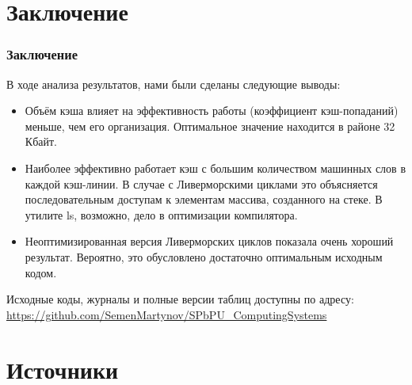 \documentclass{beamer}
\begin{document}
\section{Заключение}

\begin{frame}
\frametitle{Заключение}

В ходе анализа результатов, нами были сделаны следующие выводы:

\begin{itemize}
\item Объём кэша влияет на эффективность работы (коэффициент кэш-попаданий) меньше, чем его организация. Оптимальное значение находится в районе 32 Кбайт.
\item Наиболее эффективно работает кэш с большим количеством машинных слов в каждой кэш-линии. В случае с Ливерморскими циклами это объясняется последовательным доступам к элементам массива, созданного на стеке. В утилите ls, возможно, дело в оптимизации компилятора.
\item Неоптимизированная версия Ливерморских циклов показала очень хороший результат. Вероятно, это обусловлено достаточно оптимальным исходным кодом.
\end{itemize}

Исходные коды, журналы и полные версии таблиц доступны по адресу: \url{https://github.com/SemenMartynov/SPbPU_ComputingSystems}

\end{frame}

\section{Источники}
\end{document}
